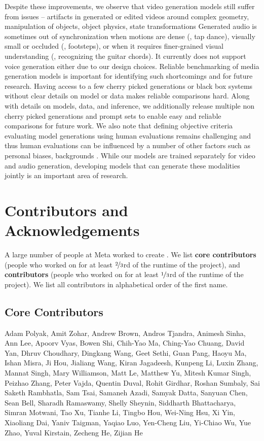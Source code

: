 \documentclass[]{fairmeta}
\begin{document}
Despite these improvements, we observe that video generation models still suffer from issues -- artifacts in generated or edited videos around complex geometry, manipulation of objects, object physics, state transformations \etc
Generated audio is sometimes out of synchronization when motions are dense (\eg, tap dance), visually small or occluded (\eg, footsteps), or when it requires finer-grained visual understanding (\eg, recognizing the guitar chords).
It currently does not support voice generation either due to our design choices.
Reliable benchmarking of media generation models is important for identifying such shortcomings and for future research.
Having access to a few cherry picked generations or black box systems without clear details on model or data makes reliable comparisons hard.
Along with details on models, data, and inference, we additionally release multiple non cherry picked generations and prompt sets to enable easy and reliable comparisons for future work.
We also note that defining objective criteria evaluating model generations using human evaluations remains challenging and thus human evaluations can be influenced by a number of other factors such as personal biases, backgrounds \etc.
While our models are trained separately for video and audio generation, developing models that can generate these modalities jointly is an important area of research.




\section*{Contributors and Acknowledgements}
A large number of people at Meta worked to create \OURS.
We list \textbf{core contributors} (people who worked on \OURS for at least $\nicefrac{2}{3}$rd of the runtime of the project), and \textbf{contributors} (people who worked on \OURS for at least $\nicefrac{1}{3}$rd of the runtime of the project).
We list all contributors in alphabetical order of the first name.


\subsection*{Core Contributors}
Adam Polyak, Amit Zohar, Andrew Brown, Andros Tjandra, Animesh Sinha, Ann Lee, Apoorv Vyas, Bowen Shi, Chih-Yao Ma, Ching-Yao Chuang, David Yan, Dhruv Choudhary, Dingkang Wang, Geet Sethi, Guan Pang, Haoyu Ma, Ishan Misra, Ji Hou, Jialiang Wang, Kiran Jagadeesh, Kunpeng Li, Luxin Zhang, Mannat Singh, Mary Williamson, Matt Le, Matthew Yu, Mitesh Kumar Singh, Peizhao Zhang, Peter Vajda, Quentin Duval, Rohit Girdhar, Roshan Sumbaly, Sai Saketh Rambhatla, Sam Tsai, Samaneh Azadi, Samyak Datta, Sanyuan Chen, Sean Bell, Sharadh Ramaswamy, Shelly Sheynin, Siddharth Bhattacharya, Simran Motwani, Tao Xu, Tianhe Li, Tingbo Hou, Wei-Ning Hsu, Xi Yin, Xiaoliang Dai, Yaniv Taigman, Yaqiao Luo, Yen-Cheng Liu, Yi-Chiao Wu, Yue Zhao, Yuval Kirstain, Zecheng He, Zijian He
\end{document}
